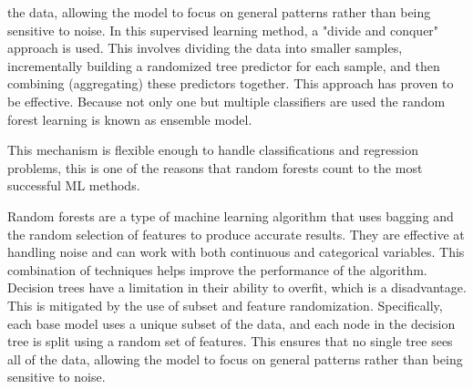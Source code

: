 the data, allowing
the model to focus on general patterns rather than being sensitive to noise. \cite[p.
251]{liu_newmachinelearning_2012}
In this supervised learning method,
a "divide and conquer" approach is used. This involves dividing the data into smaller samples,
incrementally building
a randomized tree predictor for each sample, and then combining (aggregating) these predictors
together. This
approach has proven to be effective. Because not only one but multiple classifiers are used the
random forest
learning is known as ensemble model. \cite[p. 254]{shaik_briefsurveyrandom_2019}

This mechanism is flexible enough to handle classifications and regression problems, this is one
of the reasons that
random forests count to the most successful \ac{ML} methods. \cite[p.
3-4]{biau_randomforestguided_2016} \cite[p.
25]{breiman_randomforests_2001}

%
%
Random forests are a type of machine learning algorithm that uses bagging and the random
selection of features to
produce accurate results. They are effective at handling noise and can work with both continuous
and categorical
variables. This combination of techniques helps improve the performance of the algorithm. \cite[p.
259]{liu_newmachinelearning_2012}
Decision trees have a limitation in their ability to overfit, which is a disadvantage. This is
mitigated by the use
of subset and feature randomization. Specifically, each base model uses a unique subset of the
data, and each node in
the decision tree is split using a random set of features. This ensures that no single tree sees
all of the data,
allowing the model to focus on general patterns rather than being sensitive to noise. \cite[p.
259]{liu_newmachinelearning_2012}


%


